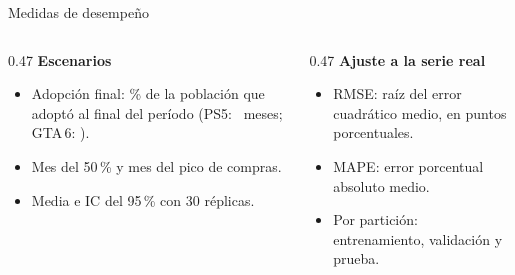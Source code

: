 \documentclass[aspectratio=169,11pt,notes=only]{beamer}
\begin{document}
\begin{frame}{Medidas de desempeño}
  \vskip4mm
  \begin{columns}[T,totalwidth=\textwidth]
    \begin{column}{0.47\textwidth}
      {\bfseries Escenarios}\par\vskip1mm
      {\small\begin{itemize}
        \item \alert{Adopción final}: \% de la población que adoptó al final del período (PS5: \cifraHorizontePs\ meses; GTA\,6: \cifraHorizonteGta).
        \item Mes del 50\,\% y mes del pico de compras.
        \item Media e IC del 95\,\% con 30 réplicas.
      \end{itemize}}
    \end{column}
    \begin{column}{0.47\textwidth}
      {\bfseries Ajuste a la serie real}\par\vskip1mm
      {\small\begin{itemize}
        \item RMSE: raíz del error cuadrático medio, en puntos porcentuales.
        \item MAPE: error porcentual absoluto medio.
        \item Por partición: entrenamiento, validación y prueba.
      \end{itemize}}
    \end{column}
  \end{columns}
\end{frame}
\end{document}
